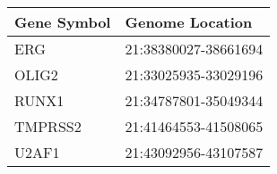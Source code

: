 \begin{tabular}{ll}
\toprule
Gene Symbol &      Genome Location \\
\midrule
        ERG & 21:38380027-38661694 \\
      OLIG2 & 21:33025935-33029196 \\
      RUNX1 & 21:34787801-35049344 \\
    TMPRSS2 & 21:41464553-41508065 \\
      U2AF1 & 21:43092956-43107587 \\
\bottomrule
\end{tabular}
